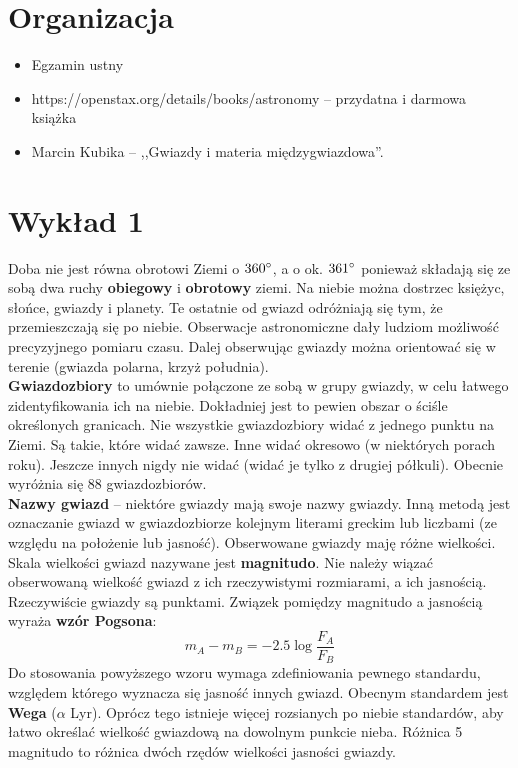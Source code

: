 \documentclass[../index.tex]{subfiles}
\begin{document}
    \section{Organizacja}
        \begin{itemize}
            \item Egzamin ustny
            \item https://openstax.org/details/books/astronomy \--- przydatna i darmowa książka
            \item Marcin Kubika \--- ,,Gwiazdy i materia międzygwiazdowa''.
        \end{itemize}
    \section{Wykład 1}
        Doba nie jest równa obrotowi Ziemi o \(360^\circ\), a o ok. \(361^\circ\) ponieważ składają się ze sobą dwa ruchy \textbf{obiegowy} i \textbf{obrotowy} ziemi. Na niebie można dostrzec księżyc, słońce, gwiazdy i planety. Te ostatnie od gwiazd odróżniają się tym, że przemieszczają się po niebie. Obserwacje astronomiczne dały ludziom możliwość precyzyjnego pomiaru czasu. Dalej obserwując gwiazdy można orientować się w terenie (gwiazda polarna, krzyż południa).\\
        \textbf{Gwiazdozbiory} to umównie połączone ze sobą w grupy gwiazdy, w celu łatwego zidentyfikowania ich na niebie. Dokładniej jest to pewien obszar o ściśle określonych granicach. Nie wszystkie gwiazdozbiory widać z jednego punktu na Ziemi. Są takie, które widać zawsze. Inne widać okresowo (w niektórych porach roku). Jeszcze innych nigdy nie widać (widać je tylko z drugiej półkuli). Obecnie wyróżnia się 88 gwiazdozbiorów. \\
        \textbf{Nazwy gwiazd} \--- niektóre gwiazdy mają swoje nazwy gwiazdy. Inną metodą jest oznaczanie gwiazd w gwiazdozbiorze kolejnym literami greckim lub liczbami (ze względu na położenie lub jasność).
        Obserwowane gwiazdy maję różne wielkości. Skala wielkości gwiazd nazywane jest \textbf{magnitudo}. Nie należy wiązać obserwowaną wielkość gwiazd z ich rzeczywistymi rozmiarami, a ich jasnością. Rzeczywiście gwiazdy są punktami. Związek pomiędzy magnitudo a jasnością wyraża \textbf{wzór Pogsona}:
        \begin{equation}
            m_A - m_B = - 2.5 \log \frac{F_A}{F_B} 
        \end{equation} 
        Do stosowania powyższego wzoru wymaga zdefiniowania pewnego standardu, względem którego wyznacza się jasność innych gwiazd. Obecnym standardem jest \textbf{Wega} (\(\alpha\)\! Lyr). Oprócz tego istnieje więcej rozsianych po niebie standardów, aby łatwo określać wielkość gwiazdową na dowolnym punkcie nieba. Różnica 5 magnitudo to różnica dwóch rzędów wielkości jasności gwiazdy.\\
\end{document}
